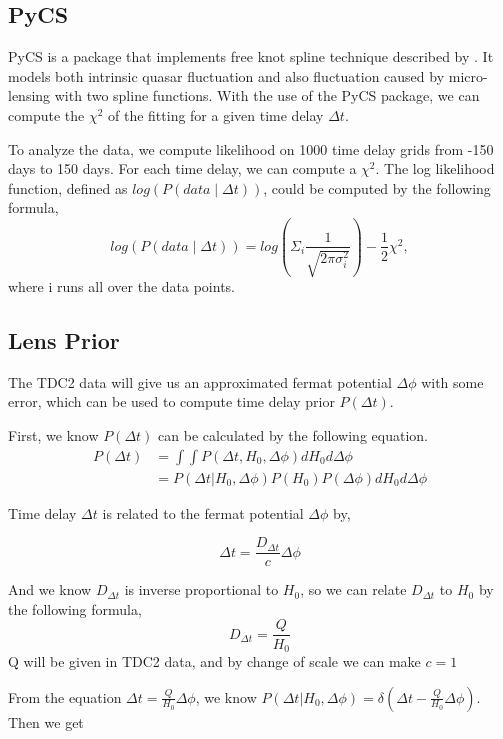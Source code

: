 \documentclass[\docopts]{\docclass}
\begin{document}
\subsection{PyCS}
PyCS is a package that implements free knot spline technique described by \cite{2013A&A...553A.120T}. It models both intrinsic quasar fluctuation and also fluctuation caused by micro-lensing with two spline functions. With the use of the PyCS package, we can compute the $\chi^2$ of the fitting for a given time delay $\Delta t$.

To analyze the data, we compute likelihood on 1000 time delay grids from -150 days to 150 days.  For each time delay, we can compute a $\chi^2$. The log likelihood function, defined as $log(P(data \mid \Delta t))$, could be computed by the following formula,
\begin{equation}
log(P(data \mid \Delta t))  = log (\Sigma_i  \frac{1}{\sqrt{2 \pi \sigma_i^2}} ) -\frac{1}{2} \chi^2,
\end{equation}
where i runs all over the data points.

\subsection{Lens Prior}
The TDC2 data will give us an approximated fermat potential $\Delta \phi$ with some error, which can be used to compute time delay prior $P(\Delta t)$.

First, we know $P(\Delta t)$ can be calculated by the following equation.
\begin{align}
P(\Delta t) &= \int \int P(\Delta t, H_0, \Delta \phi) dH_0 d \Delta \phi \\
&= P(\Delta t | H_0, \Delta \phi) P(H_0)P(\Delta \phi) dH_0 d\Delta \phi
\end{align}

Time delay $\Delta t$ is related to the fermat potential $\Delta \phi$ by,

\begin{equation}
\Delta t = \frac{D_{\Delta t}}{c} \Delta \phi
\end{equation}

And we know $D_{\Delta t}$ is inverse proportional to $H_0$, so we can relate $D_{\Delta t}$ to $H_0$ by the following formula,
\begin{equation}
D_{\Delta t}= \frac{Q}{H_0}
\end{equation}
Q will be given in TDC2 data, and by change of scale we can make $c =1$

From the equation $\Delta t = \frac{Q}{H_0}\Delta \phi$,  we know
$P(\Delta t | H_0, \Delta \phi) = \delta(\Delta t - \frac{Q}{H_0}\Delta \phi)$.
Then we get
\end{document}
